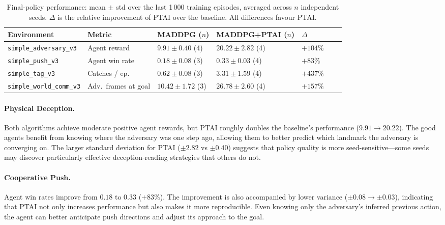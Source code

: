 \documentclass[12pt]{article}
\begin{document}
\begin{table}[H]
\centering
\caption{Final-policy performance: mean $\pm$ std over the last 1\,000 training episodes,
averaged across $n$ independent seeds. $\Delta$ is the relative improvement of PTAI over
the baseline. All differences favour PTAI.}
\label{tab:results}
\begin{tabular}{lllllll}
\toprule
Environment & Metric & MADDPG ($n$) & MADDPG+PTAI ($n$) & $\Delta$ \\
\midrule
\texttt{simple\_adversary\_v3}
  & Agent reward
  & $9.91 \pm 0.40$ (4)
  & $20.22 \pm 2.82$ (4)
  & $+104\%$ \\
\texttt{simple\_push\_v3}
  & Agent win rate
  & $0.18 \pm 0.08$ (3)
  & $0.33 \pm 0.03$ (4)
  & $+83\%$ \\
\texttt{simple\_tag\_v3}
  & Catches / ep.
  & $0.62 \pm 0.08$ (3)
  & $3.31 \pm 1.59$ (4)
  & $+437\%$ \\
\texttt{simple\_world\_comm\_v3}
  & Adv.\ frames at goal
  & $10.42 \pm 1.72$ (3)
  & $26.78 \pm 2.60$ (4)
  & $+157\%$ \\
\bottomrule
\end{tabular}
\end{table}

\paragraph{Physical Deception.}
Both algorithms achieve moderate positive agent rewards, but PTAI roughly doubles the
baseline's performance ($9.91 \to 20.22$). The good agents benefit from knowing where
the adversary was one step ago, allowing them to better predict which landmark the
adversary is converging on. The larger standard deviation for PTAI ($\pm 2.82$ vs
$\pm 0.40$) suggests that policy quality is more seed-sensitive---some seeds may discover
particularly effective deception-reading strategies that others do not.

\paragraph{Cooperative Push.}
Agent win rates improve from $0.18$ to $0.33$ ($+83\%$). The improvement is also
accompanied by lower variance ($\pm 0.08 \to \pm 0.03$), indicating that PTAI not only
increases performance but also makes it more reproducible. Even knowing only the
adversary's inferred previous action, the agent can better anticipate push directions and
adjust its approach to the goal.
\end{document}
